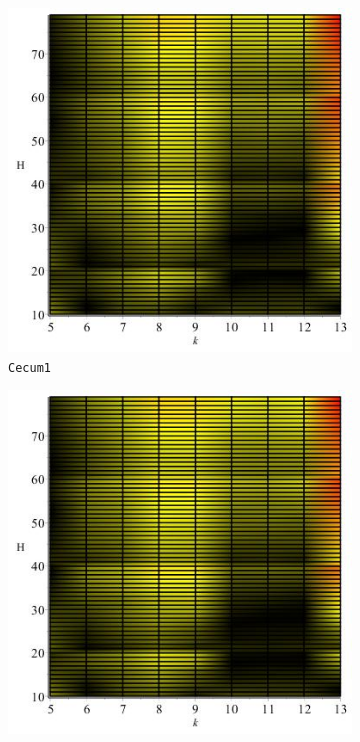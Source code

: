 \documentclass[../../main.tex]{subfiles}
\begin{document}
\begin{figure}[H]
\begin{subfigure}[b]{.5\textwidth}
\includegraphics[width=\textwidth]{precision/minmax/cecum1precise}
\caption{\texttt{Cecum1}}
\end{subfigure}
\begin{subfigure}[b]{.5\textwidth}
\includegraphics[width=\textwidth]{precision/minmax/cecum2precise}

\end{subfigure}
\end{figure}
\end{document}
